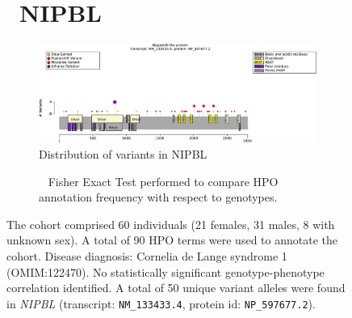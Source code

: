 \begin{figure}[htbp]
\section*{ NIPBL}
\centering
\begin{subfigure}[b]{0.95\textwidth}
\centering
\includegraphics[width=\textwidth]{ img/NIPBL_protein_diagram.pdf} 
\captionsetup{justification=raggedright,singlelinecheck=false}
\caption{Distribution of variants in NIPBL}
\end{subfigure}

\vspace{2em}

\begin{subfigure}[b]{0.95\textwidth}
\centering
{}
\captionsetup{justification=raggedright,singlelinecheck=false}
\caption{             Fisher Exact Test performed to compare HPO annotation frequency with respect to genotypes. }
\end{subfigure}

\vspace{2em}

\caption{ The cohort comprised 60 individuals (21 females, 31 males, 8 with unknown sex). A total of 90 HPO terms were used to annotate the cohort. Disease diagnosis: Cornelia de Lange syndrome 1 (OMIM:122470). No statistically significant genotype-phenotype correlation identified. A total of 50 unique variant alleles were found in \textit{NIPBL} (transcript: \texttt{NM\_133433.4}, protein id: \texttt{NP\_597677.2}).}
\end{figure}
